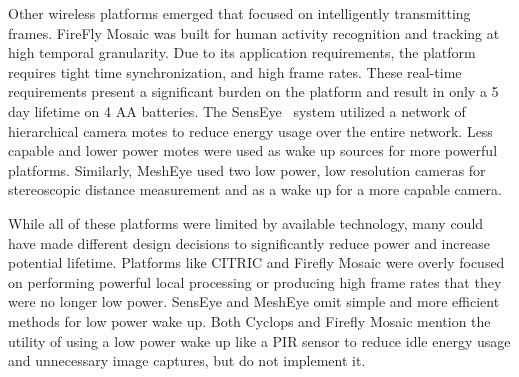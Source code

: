 Other wireless platforms emerged that focused on intelligently transmitting frames.
FireFly Mosaic \cite{rowe2007firefly} was built for human activity recognition and tracking at high temporal granularity. Due to its application requirements, the platform requires tight time synchronization, and high frame rates. These real-time requirements present a significant burden on the platform and result in only a 5 day lifetime on 4 AA batteries.
The SensEye~\cite{kulkarni2005senseye} system utilized a network of hierarchical camera motes to reduce energy usage over the entire network. Less capable and lower power motes were used as wake up sources for more powerful platforms. Similarly, MeshEye used two low power, low resolution cameras for stereoscopic distance measurement and as a wake up for a more capable camera.

While all of these platforms were limited by available technology, many could have made different design decisions to significantly reduce power and increase potential lifetime. Platforms like CITRIC and Firefly Mosaic were overly focused on performing powerful local processing or producing high frame rates that they were no longer low power. SensEye and MeshEye omit simple and more efficient methods for low power wake up. Both Cyclops and Firefly Mosaic mention the utility of using a low power wake up like a PIR sensor to reduce idle energy usage and unnecessary image captures, but do not implement it. 




